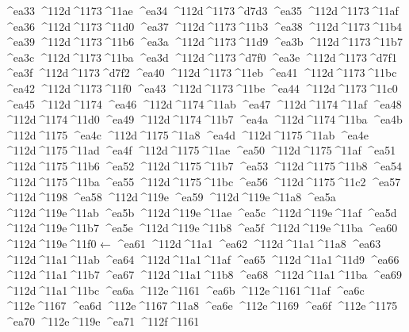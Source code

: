 \checkit ^^^^ea33 ^^^^112d^^^^1173^^^^11ae
\checkit ^^^^ea34 ^^^^112d^^^^1173^^^^d7d3
\checkit ^^^^ea35 ^^^^112d^^^^1173^^^^11af
\checkit ^^^^ea36 ^^^^112d^^^^1173^^^^11d0
\checkit ^^^^ea37 ^^^^112d^^^^1173^^^^11b3
\checkit ^^^^ea38 ^^^^112d^^^^1173^^^^11b4
\checkit ^^^^ea39 ^^^^112d^^^^1173^^^^11b6
\checkit ^^^^ea3a ^^^^112d^^^^1173^^^^11d9
\checkit ^^^^ea3b ^^^^112d^^^^1173^^^^11b7
\checkit ^^^^ea3c ^^^^112d^^^^1173^^^^11ba
\checkit ^^^^ea3d ^^^^112d^^^^1173^^^^d7f0
\checkit ^^^^ea3e ^^^^112d^^^^1173^^^^d7f1
\checkit ^^^^ea3f ^^^^112d^^^^1173^^^^d7f2
\checkit ^^^^ea40 ^^^^112d^^^^1173^^^^11eb
\checkit ^^^^ea41 ^^^^112d^^^^1173^^^^11bc
\checkit ^^^^ea42 ^^^^112d^^^^1173^^^^11f0
\checkit ^^^^ea43 ^^^^112d^^^^1173^^^^11be
\checkit ^^^^ea44 ^^^^112d^^^^1173^^^^11c0
\checkit ^^^^ea45 ^^^^112d^^^^1174
\checkit ^^^^ea46 ^^^^112d^^^^1174^^^^11ab
\checkit ^^^^ea47 ^^^^112d^^^^1174^^^^11af
\checkit ^^^^ea48 ^^^^112d^^^^1174^^^^11d0
\checkit ^^^^ea49 ^^^^112d^^^^1174^^^^11b7
\checkit ^^^^ea4a ^^^^112d^^^^1174^^^^11ba
\checkit ^^^^ea4b ^^^^112d^^^^1175
\checkit ^^^^ea4c ^^^^112d^^^^1175^^^^11a8
\checkit ^^^^ea4d ^^^^112d^^^^1175^^^^11ab
\checkit ^^^^ea4e ^^^^112d^^^^1175^^^^11ad
\checkit ^^^^ea4f ^^^^112d^^^^1175^^^^11ae
\checkit ^^^^ea50 ^^^^112d^^^^1175^^^^11af
\checkit ^^^^ea51 ^^^^112d^^^^1175^^^^11b6
\checkit ^^^^ea52 ^^^^112d^^^^1175^^^^11b7
\checkit ^^^^ea53 ^^^^112d^^^^1175^^^^11b8
\checkit ^^^^ea54 ^^^^112d^^^^1175^^^^11ba
\checkit ^^^^ea55 ^^^^112d^^^^1175^^^^11bc
\checkit ^^^^ea56 ^^^^112d^^^^1175^^^^11c2
\checkit ^^^^ea57 ^^^^112d^^^^1198
\checkit ^^^^ea58 ^^^^112d^^^^119e
\checkit ^^^^ea59 ^^^^112d^^^^119e^^^^11a8
\checkit ^^^^ea5a ^^^^112d^^^^119e^^^^11ab
\checkit ^^^^ea5b ^^^^112d^^^^119e^^^^11ae
\checkit ^^^^ea5c ^^^^112d^^^^119e^^^^11af
\checkit ^^^^ea5d ^^^^112d^^^^119e^^^^11b7
\checkit ^^^^ea5e ^^^^112d^^^^119e^^^^11b8
\checkit ^^^^ea5f ^^^^112d^^^^119e^^^^11ba
\checkit ^^^^ea60 ^^^^112d^^^^119e^^^^11f0 ←
\checkit ^^^^ea61 ^^^^112d^^^^11a1
\checkit ^^^^ea62 ^^^^112d^^^^11a1^^^^11a8
\checkit ^^^^ea63 ^^^^112d^^^^11a1^^^^11ab
\checkit ^^^^ea64 ^^^^112d^^^^11a1^^^^11af
\checkit ^^^^ea65 ^^^^112d^^^^11a1^^^^11d9
\checkit ^^^^ea66 ^^^^112d^^^^11a1^^^^11b7
\checkit ^^^^ea67 ^^^^112d^^^^11a1^^^^11b8
\checkit ^^^^ea68 ^^^^112d^^^^11a1^^^^11ba
\checkit ^^^^ea69 ^^^^112d^^^^11a1^^^^11bc
\checkit ^^^^ea6a ^^^^112e^^^^1161
\checkit ^^^^ea6b ^^^^112e^^^^1161^^^^11af
\checkit ^^^^ea6c ^^^^112e^^^^1167
\checkit ^^^^ea6d ^^^^112e^^^^1167^^^^11a8
\checkit ^^^^ea6e ^^^^112e^^^^1169
\checkit ^^^^ea6f ^^^^112e^^^^1175
\checkit ^^^^ea70 ^^^^112e^^^^119e
\checkit ^^^^ea71 ^^^^112f^^^^1161
